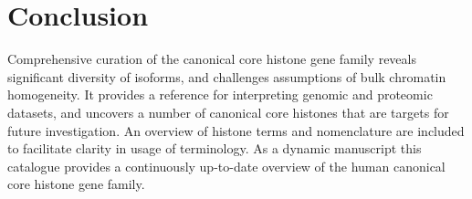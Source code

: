\section{Conclusion}
\label{sec:conclusion}

  Comprehensive curation of the canonical core histone gene family
  reveals significant diversity of isoforms,
  and challenges assumptions of bulk chromatin homogeneity.
  It provides a reference for interpreting genomic and proteomic datasets,
  and uncovers a number of canonical core histones that are targets for future investigation.
  An overview of histone terms and nomenclature
  are included to facilitate clarity in usage of terminology.
  As a dynamic manuscript this catalogue provides a continuously up-to-date overview
  of the human canonical core histone gene family.

